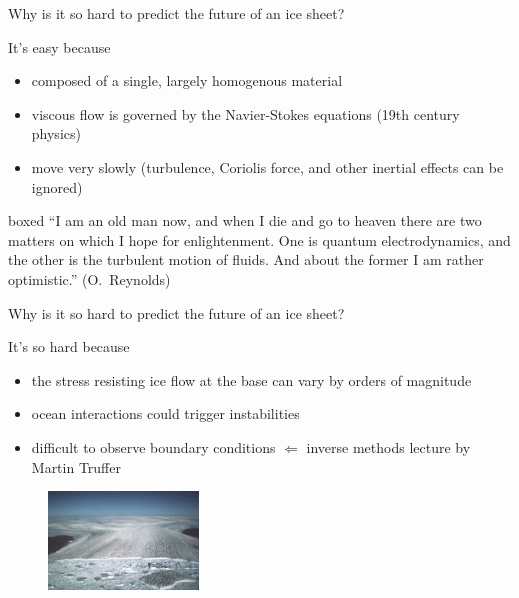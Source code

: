 \documentclass[hide notes,intlimits,unknownkeysallowed]{beamer}
\begin{document}
\begin{frame}{Why is it so hard to predict the future of an ice
    sheet?}
  \begin{block}{It's easy because}
   \begin{itemize}
    \item composed of a single, largely homogenous material
    \item viscous flow is governed by the Navier-Stokes equations (19th century physics)
    \item move very slowly (turbulence, Coriolis force, and other inertial effects can be ignored)
   \end{itemize}
  \begin{beamercolorbox}[rounded=true,shadow=true]{boxed}
``I am an old man now, and when I die and go to heaven there are two matters on which I hope for enlightenment. One is quantum electrodynamics, and the other is the turbulent motion of fluids. And about the former I am rather optimistic.'' (O.~Reynolds)
  \end{beamercolorbox}

  \end{block}
\end{frame}

\begin{frame}{Why is it so hard to predict the future of an ice
    sheet?}
  \begin{block}{It's so hard because}
   \begin{itemize}
    \item the stress resisting ice flow at the base can vary by orders of magnitude
    \item ocean interactions could trigger instabilities
    \item difficult to observe boundary conditions $\Leftarrow$ \alert{inverse methods} lecture by Martin Truffer
  \end{itemize}
  \end{block}
  \begin{figure}
    \includegraphics[width=4cm]{jakobshavn_calving}
  \end{figure}
\end{frame}
\end{document}
